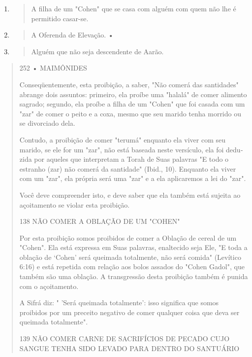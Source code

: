 \begin{enumerate}
\def\labelenumi{\arabic{enumi}.}
\setcounter{enumi}{301}
\item
  \begin{quote}
  A filha de um "Cohen" que se casa com alguém com quem não lhe é
  permitido casar-se.
  \end{quote}
\item
  \begin{quote}
  A Oferenda de Elevação. •
  \end{quote}
\item
  \begin{quote}
  Alguém que não seja descendente de Aarão.
  \end{quote}
\end{enumerate}

\begin{quote}
252 • MAIMÔNIDES

Conseqüentemente, esta proibição, a saber, "Não comerá das santi­dades"
abrange dois assuntos: primeiro, ela proíbe uma "halalá" de comer
ali­mento sagrado; segundo, ela proíbe a filha de um "Cohen" que foi
casada com um "zar" de comer o peito e a coxa, mesmo que seu marido
tenha morrido ou se divorciado dela.

Contudo, a proibição de comer "terumá" enquanto ela viver com seu
marido, se ele for um "zar", não está baseada neste versículo, ela foi
dedu­zida por aqueles que interpretam a Torah de Suas palavras "E todo o
estranho (zar) não comerá da santidade" (Ibid., 10). Enquanto ela viver
com um "zar", ela própria será uma "zar" e a ela aplicaremos a lei do
"zar".

Você deve compreender isto, e deve saber que ela também está su­jeita ao
açoitamento se violar esta proibição.

138 NÃO COMER A OBLAÇÃO DE UM "COHEN"

Por esta proibição somos proibidos de comer a Oblação de cereal de um
"Cohen". Ela está expressa em Suas palavras, enaltecido seja Ele, "E
to­da a oblação de `Cohen' será queimada totalmente, não será comida"
(Levítico 6:16) e está repetida com relação aos bolos assados do "Cohen
Gadol", que também são uma oblação. A transgressão desta proibição
também é punida com o açoitamento.

A Sifrá diz: " 'Será queimada totalmente': isso significa que somos
proibidos por um preceito negativo de comer qualquer coisa que deva ser
quei­mada totalmente".

139 NÃO COMER CARNE DE SACRIFÍCIOS DE PECADO CUJO SANGUE TENHA SIDO
LEVADO PARA DENTRO DO SANTUÁRIO


\end{quote}
